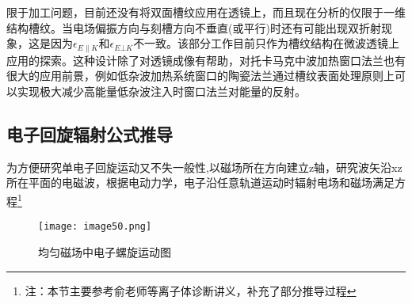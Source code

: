 
\chapter{}



限于加工问题，目前还没有将双面槽纹应用在透镜上，而且现在分析的仅限于一维结构槽纹。当电场偏振方向与刻槽方向不垂直(或平行)时还有可能出现双折射现象，这是因为$ϵ_{E∥K}$和$ϵ_{E⊥K}$不一致。该部分工作目前只作为槽纹结构在微波透镜上应用的探索。这种设计除了对透镜成像有帮助，对托卡马克中波加热窗口法兰也有很大的应用前景，例如低杂波加热系统窗口的陶瓷法兰通过槽纹表面处理原则上可以实现极大减少高能量低杂波注入时窗口法兰对能量的反射。
\clearpage
\section{电子回旋辐射公式推导}
\label{sec:A1}
为方便研究单电子回旋运动又不失一般性,以磁场所在方向建立z轴，研究波矢沿xz所在平面的电磁波，根据电动力学，电子沿任意轨道运动时辐射电场和磁场满足方程\footnote{注：本节主要参考俞老师等离子体诊断讲义，补充了部分推导过程}
\begin{figure}[ht]
\centering
\texttt{[image: image50.png]}
\caption{\label{fig:elecorb2}均匀磁场中电子螺旋运动图}
\end{figure}

